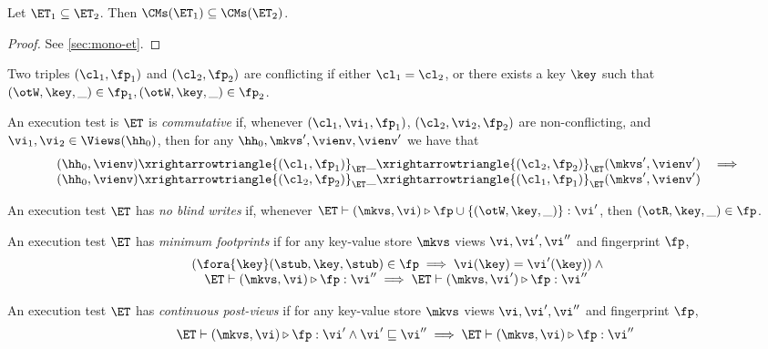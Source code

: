 \begin{proposition}
\label{prop:mono-et}
Let $\ET_1 \subseteq \ET_2$. Then $\CMs(\ET_1) \subseteq \CMs(\ET_2)$.
\end{proposition}
\begin{proof}
    \ifTechReport
    
    \else
    See \cref{sec:mono-et}.
    \fi
\end{proof}

\begin{definition}
Two triples $(\cl_1, \fp_1)$ and $(\cl_2, \fp_2)$ are 
conflicting if either $\cl_1 = \cl_2$, or there exists a key $\key$ such that 
$(\otW, \key, \_) \in \fp_1, (\otW, \key, \_) \in \fp_2$. 

An execution test is $\ET$ is \emph{commutative} if, whenever $(\cl_1, \vi_1, \fp_1)$, 
$(\cl_2, \vi_2, \fp_2)$ are non-conflicting, and $\vi_1, \vi_2 \in \Views(\hh_0)$,  
then for any $\hh_0, \mkvs', \vienv, \vienv'$ we have that 
\[
\begin{array}{lr}
(\hh_0, \vienv) \xrightarrowtriangle{(\cl_1, \fp_1)}_{\ET} 
\_ \xrightarrowtriangle{(\cl_2, \fp_2)}_{\ET} (\mkvs', \vienv') &\implies \\
(\hh_0, \vienv) \xrightarrowtriangle{(\cl_2, \fp_2)}_{\ET} 
\_ \xrightarrowtriangle{(\cl_1, \fp_1)}_{\ET} (\mkvs', \vienv')
\end{array}
\]
\end{definition}

\begin{definition}
An execution test $\ET$ has \emph{no blind writes} if, whenever $\ET \vdash (\mkvs, \vi) \triangleright \fp \cup \{(\otW, \key, \_)\} : \vi'$, 
then $(\otR, \key, \_) \in \fp$.
\end{definition}

\begin{definition}
An execution test $\ET$ has \emph{minimum footprints} if for any key-value store \( \mkvs \)
views \( \vi, \vi',\vi''\) and fingerprint \( \fp \),
\[
\begin{array}{@{}l@{}}
    ( \fora{ \key} (\stub, \key, \stub) \in \fp \implies \vi(\key) = \vi'(\key) ) \land {} \\
    \quad \ET \vdash (\mkvs, \vi) \triangleright \fp : \vi'' \implies \ET \vdash (\mkvs, \vi') \triangleright \fp : \vi''
\end{array}
\]
\end{definition}

\begin{definition}
An execution test $\ET$ has \emph{continuous post-views} if for any key-value store \( \mkvs \)
views \( \vi, \vi',\vi''\) and fingerprint \( \fp \), 
\[
\begin{array}{@{}l@{}}
    \quad \ET \vdash (\mkvs, \vi) \triangleright \fp : \vi' \land \vi' \sqsubseteq \vi'' \implies \ET \vdash (\mkvs, \vi) \triangleright \fp : \vi''
\end{array}
\]
\end{definition}

